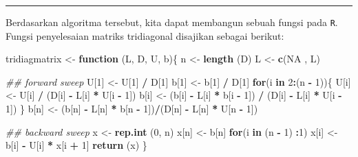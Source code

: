 \documentclass[]{book}
\newenvironment{Shaded}{\begin{snugshade}}{\end{snugshade}}
\newcommand{\CommentTok}[1]{\textcolor[rgb]{0.56,0.35,0.01}{\textit{#1}}}
\newcommand{\ControlFlowTok}[1]{\textcolor[rgb]{0.13,0.29,0.53}{\textbf{#1}}}
\newcommand{\DecValTok}[1]{\textcolor[rgb]{0.00,0.00,0.81}{#1}}
\newcommand{\KeywordTok}[1]{\textcolor[rgb]{0.13,0.29,0.53}{\textbf{#1}}}
\newcommand{\NormalTok}[1]{#1}
\newcommand{\OperatorTok}[1]{\textcolor[rgb]{0.81,0.36,0.00}{\textbf{#1}}}
\newcommand{\OtherTok}[1]{\textcolor[rgb]{0.56,0.35,0.01}{#1}}
\newcommand{\StringTok}[1]{\textcolor[rgb]{0.31,0.60,0.02}{#1}}
\theoremstyle{definition}
\theoremstyle{definition}
\theoremstyle{definition}
\theoremstyle{remark}
\begin{document}
\begin{center}\rule{0.5\linewidth}{\linethickness}\end{center}

Berdasarkan algoritma tersebut, kita dapat membangun sebuah fungsi pada \texttt{R}. Fungsi penyelesaian matriks tridiagonal disajikan sebagai berikut:

\begin{Shaded}
\begin{Highlighting}[]
\NormalTok{tridiagmatrix <-}\StringTok{ }\ControlFlowTok{function}\NormalTok{ (L, D, U, b)\{}
\NormalTok{  n <-}\StringTok{ }\KeywordTok{length}\NormalTok{ (D)}
\NormalTok{  L <-}\StringTok{ }\KeywordTok{c}\NormalTok{(}\OtherTok{NA}\NormalTok{ , L)}
  
  \CommentTok{## forward sweep}
\NormalTok{  U[}\DecValTok{1}\NormalTok{] <-}\StringTok{ }\NormalTok{U[}\DecValTok{1}\NormalTok{] }\OperatorTok{/}\StringTok{ }\NormalTok{D[}\DecValTok{1}\NormalTok{]}
\NormalTok{  b[}\DecValTok{1}\NormalTok{] <-}\StringTok{ }\NormalTok{b[}\DecValTok{1}\NormalTok{] }\OperatorTok{/}\StringTok{ }\NormalTok{D[}\DecValTok{1}\NormalTok{]}
  \ControlFlowTok{for}\NormalTok{(i }\ControlFlowTok{in} \DecValTok{2}\OperatorTok{:}\NormalTok{(n }\OperatorTok{-}\StringTok{ }\DecValTok{1}\NormalTok{))\{}
\NormalTok{      U[i] <-}\StringTok{ }\NormalTok{U[i] }\OperatorTok{/}\StringTok{ }\NormalTok{(D[i] }\OperatorTok{-}\StringTok{ }\NormalTok{L[i] }\OperatorTok{*}\StringTok{ }\NormalTok{U[i }\OperatorTok{-}\StringTok{ }\DecValTok{1}\NormalTok{])}
\NormalTok{      b[i] <-}\StringTok{ }\NormalTok{(b[i] }\OperatorTok{-}\StringTok{ }\NormalTok{L[i] }\OperatorTok{*}\StringTok{ }\NormalTok{b[i }\OperatorTok{-}\StringTok{ }\DecValTok{1}\NormalTok{]) }\OperatorTok{/}
\StringTok{      }\NormalTok{(D[i] }\OperatorTok{-}\StringTok{ }\NormalTok{L[i] }\OperatorTok{*}\StringTok{ }\NormalTok{U[i }\OperatorTok{-}\StringTok{ }\DecValTok{1}\NormalTok{])}
\NormalTok{  \}}
\NormalTok{  b[n] <-}\StringTok{ }\NormalTok{(b[n] }\OperatorTok{-}\StringTok{ }\NormalTok{L[n] }\OperatorTok{*}\StringTok{ }\NormalTok{b[n }\OperatorTok{-}\StringTok{ }\DecValTok{1}\NormalTok{])}\OperatorTok{/}\NormalTok{(D[n] }\OperatorTok{-}\StringTok{ }\NormalTok{L[n] }\OperatorTok{*}\StringTok{ }\NormalTok{U[n }\OperatorTok{-}\StringTok{ }\DecValTok{1}\NormalTok{])}
  
  \CommentTok{## backward sweep}
\NormalTok{  x <-}\StringTok{ }\KeywordTok{rep.int}\NormalTok{ (}\DecValTok{0}\NormalTok{, n)}
\NormalTok{  x[n] <-}\StringTok{ }\NormalTok{b[n]}
  \ControlFlowTok{for}\NormalTok{(i }\ControlFlowTok{in}\NormalTok{ (n }\OperatorTok{-}\StringTok{ }\DecValTok{1}\NormalTok{) }\OperatorTok{:}\DecValTok{1}\NormalTok{)}
\NormalTok{      x[i] <-}\StringTok{ }\NormalTok{b[i] }\OperatorTok{-}\StringTok{ }\NormalTok{U[i] }\OperatorTok{*}\StringTok{ }\NormalTok{x[i }\OperatorTok{+}\StringTok{ }\DecValTok{1}\NormalTok{]}
  \KeywordTok{return}\NormalTok{ (x)}
\NormalTok{\}}
\end{Highlighting}
\end{Shaded}
\end{document}
